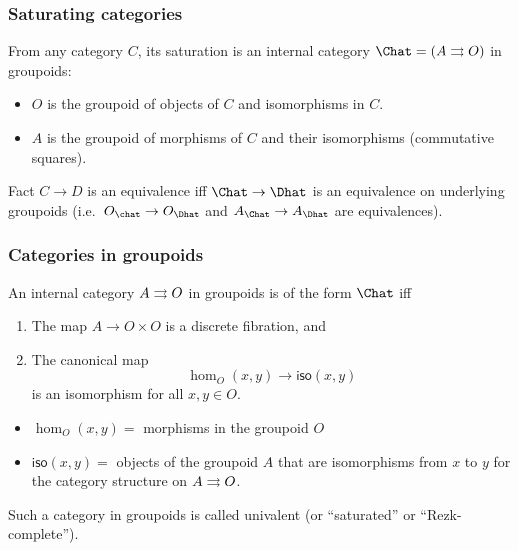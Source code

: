 \documentclass{beamer}
\begin{document}
\begin{frame}
  \frametitle{Saturating categories}
  From any category $C$, its \alert<1>{saturation} is an internal category $\Chat = (A\toto O)$ in groupoids:
  \begin{itemize}
  \item $O$ is the groupoid of objects of $C$ and isomorphisms in $C$.
  \item $A$ is the groupoid of morphisms of $C$ and their isomorphisms (commutative squares).
  \end{itemize}
  \pause
  \begin{block}{Fact}
    $C\to D$ is an equivalence iff $\Chat \to \Dhat$ is an \alert{equivalence on underlying groupoids} (i.e.\ $O_{\chat} \to O_{\Dhat}$ and $A_{\Chat} \to A_{\Dhat}$ are equivalences).
  \end{block}
\end{frame}

\begin{frame}
  \frametitle{Categories in groupoids}
  \begin{theorem}
    An internal category $A\rightrightarrows O$ in groupoids is of the form $\Chat$ iff
    \begin{enumerate}
    \item The map $A\to O\times O$ is a discrete fibration, and
    \item The canonical map
    \[ \hom_O(x,y) \to \mathsf{iso}(x,y) \]
    is an isomorphism for all $x,y\in O$.
    \end{enumerate}
  \end{theorem}
  \begin{itemize}
  \item $\hom_O(x,y)=$ morphisms in the groupoid $O$
  \item $\mathsf{iso}(x,y)=$ objects of the groupoid $A$ that are isomorphisms from $x$ to $y$ for the category structure on $A\rightrightarrows O$.
  \end{itemize}
  Such a category in groupoids is called \alert{univalent} (or ``saturated'' or ``Rezk-complete'').
\end{frame}
\end{document}
